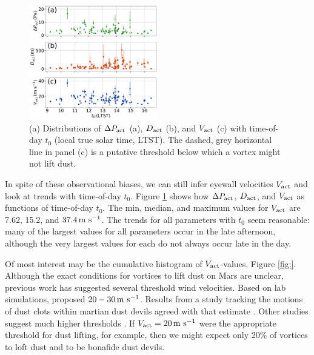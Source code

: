 \documentclass{aastex63}
\begin{document}
\begin{figure}
    \centering
    \includegraphics[width=0.5\textwidth]{figures/all_actual_values_vs_t0.png}
    \caption{(a) Distributions of $\Delta P_{\rm act}$ (a), $D_{\rm act}$ (b), and $V_{\rm act}$ (c) with time-of-day $t_0$ (local true solar time, LTST). The dashed, grey horizontal line in panel (c) is a putative threshold below which a vortex might not lift dust.}
    \label{fig:all_actual_values_vs_t0}
\end{figure}

In spite of these observational biases, we can still infer eyewall velocities $V_{\rm act}$ and look at trends with time-of-day $t_0$. Figure \ref{fig:all_actual_values_vs_t0} shows how $\Delta P_{\rm act}$, $D_{\rm act}$, and $V_{\rm act}$ as functions of time-of-day $t_0$. The min, median, and maximum values for $V_{\rm act}$ are 7.62, 15.2, and $37.4\,{\rm m\ s^{-1}}$. The trends for all parameters with $t_0$ seem reasonable: many of the largest values for all parameters occur in the late afternoon, although the very largest values for each do not always occur late in the day. 

Of most interest may be the cumulative histogram of $V_{\rm act}$-values, Figure \ref{fig:}. Although the exact conditions for vortices to lift dust on Mars are unclear, previous work has suggested several threshold wind velocities. Based on lab simulations, \citet{2003JGRE..108.5041G} proposed $20-30\,{\rm m\ s^{-1}}$. Results from a study tracking the motions of dust clots within martian dust devils agreed with that estimate \citep{2011GeoRL..3824206C}. Other studies suggest much higher thresholds \citep[cf.][]{202006JGRE..11112002C06}. If $V_{\rm act} = 20\,{\rm m\ s^{-1}}$ were the appropriate threshold for dust lifting, for example, then we might expect only 20\% of vortices to loft dust and to be bonafide dust devils. \citet{}
\end{document}
